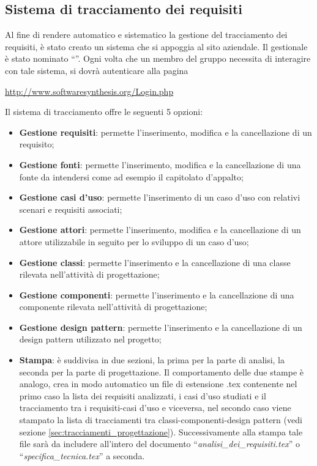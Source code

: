 \subsection{Sistema di tracciamento dei requisiti}
\label{sec:tracciamento}
Al fine di rendere automatico e sistematico la gestione del tracciamento dei requisiti, è stato creato un sistema che si appoggia al sito aziendale. Il gestionale è stato nominato ``\manager{}''. Ogni volta che un membro del gruppo necessita di interagire con tale sistema, si dovrà autenticare alla pagina
\newline
\begin{center}
\url{http://www.softwaresynthesis.org/Login.php}
\end{center}
Il sistema di tracciamento offre le seguenti 5 opzioni:
\begin{itemize}
\item \textbf{Gestione requisiti}: permette l'inserimento, modifica e la cancellazione di un requisito;
\item \textbf{Gestione fonti}: permette l'inserimento, modifica e la cancellazione di una fonte da intendersi come ad esempio il capitolato d'appalto;
\item \textbf{Gestione casi d'uso}: permette l'inserimento di un caso d'uso con relativi scenari  e requisiti associati;
\item \textbf{Gestione attori}: permette l'inserimento, modifica e la cancellazione di un attore utilizzabile in seguito per lo sviluppo di un caso d'uso;
\item \textbf{Gestione classi}: permette l'inserimento e la cancellazione di una classe rilevata nell'attività di progettazione;
\item \textbf{Gestione componenti}: permette l'inserimento e la cancellazione di una componente rilevata nell'attività di progettazione;
\item \textbf{Gestione design pattern}: permette l'inserimento e la cancellazione di un design pattern utilizzato nel progetto;

\item \textbf{Stampa}: è suddivisa in due sezioni, la prima per la parte di analisi, la seconda per la parte di progettazione. Il comportamento delle due stampe è analogo, crea in modo automatico un file di estensione .tex contenente nel primo caso la lista dei requisiti analizzati, i casi d'uso studiati e il tracciamento tra i requisiti-casi d'uso e viceversa, nel secondo caso viene stampato la lista di tracciamenti tra classi-componenti-design pattern (vedi sezione \ref{sec:tracciamenti_progettazione}). Successivamente alla stampa tale file sarà da includere all'intero del documento ``\textit{analisi\_dei\_requisiti.tex}'' o ``\textit{specifica\_tecnica.tex}'' a seconda.
\end{itemize}
